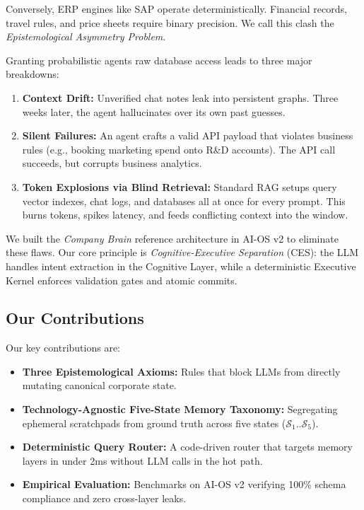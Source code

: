 \documentclass[10pt,journal,compsoc]{IEEEtran}
\begin{document}
Conversely, ERP engines like SAP operate deterministically. Financial records, travel rules, and price sheets require binary precision. We call this clash the \emph{Epistemological Asymmetry Problem}.

Granting probabilistic agents raw database access leads to three major breakdowns:
\begin{enumerate}
    \item \textbf{Context Drift:} Unverified chat notes leak into persistent graphs. Three weeks later, the agent hallucinates over its own past guesses.
    \item \textbf{Silent Failures:} An agent crafts a valid API payload that violates business rules (e.g., booking marketing spend onto R\&D accounts). The API call succeeds, but corrupts business analytics.
    \item \textbf{Token Explosions via Blind Retrieval:} Standard RAG setups query vector indexes, chat logs, and databases all at once for every prompt. This burns tokens, spikes latency, and feeds conflicting context into the window.
\end{enumerate}

We built the \emph{Company Brain} reference architecture in AI-OS v2 to eliminate these flaws. Our core principle is \emph{Cognitive-Executive Separation} (CES): the LLM handles intent extraction in the Cognitive Layer, while a deterministic Executive Kernel enforces validation gates and atomic commits.

\subsection{Our Contributions}
Our key contributions are:
\begin{itemize}
    \item \textbf{Three Epistemological Axioms:} Rules that block LLMs from directly mutating canonical corporate state.
    \item \textbf{Technology-Agnostic Five-State Memory Taxonomy:} Segregating ephemeral scratchpads from ground truth across five states ($\mathcal{S}_1..\mathcal{S}_5$).
    \item \textbf{Deterministic Query Router:} A code-driven router that targets memory layers in under 2ms without LLM calls in the hot path.
    \item \textbf{Empirical Evaluation:} Benchmarks on AI-OS v2 verifying 100\% schema compliance and zero cross-layer leaks.
\end{itemize}
\end{document}
